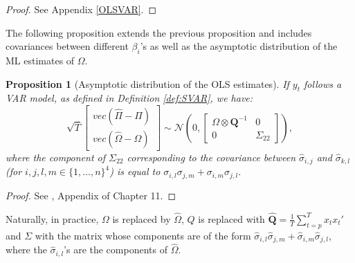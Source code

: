\documentclass[
]{book}
\newtheorem{proposition}{Proposition}[chapter]
\theoremstyle{definition}
\theoremstyle{definition}
\theoremstyle{definition}
\theoremstyle{definition}
\theoremstyle{remark}
\begin{document}
\begin{proof}
See Appendix \ref{OLSVAR}.
\end{proof}

The following proposition extends the previous proposition and includes covariances between different \(\beta_i\)'s as well as the asymptotic distribution of the ML estimates of \(\Omega\).

\begin{proposition}[Asymptotic distribution of the OLS estimates]
\protect\hypertarget{prp:OLSVAR2}{}\label{prp:OLSVAR2}If \(y_t\) follows a VAR model, as defined in Definition \ref{def:SVAR}, we have:
\begin{equation}
\sqrt{T}\left[
\begin{array}{c}
vec(\hat\Pi - \Pi)\\
vec(\hat\Omega - \Omega)
\end{array}
\right]
\sim \mathcal{N}\left(0,
\left[
\begin{array}{cc}
\Omega \otimes \mathbf{Q}^{-1} & 0\\
0 & \Sigma_{22}
\end{array}
\right]\right),\label{eq:asymptPi}
\end{equation}
where the component of \(\Sigma_{22}\) corresponding to the covariance between \(\hat\sigma_{i,j}\) and \(\hat\sigma_{k,l}\) (for \(i,j,l,m \in \{1,\dots,n\}^4\)) is equal to \(\sigma_{i,l}\sigma_{j,m}+\sigma_{i,m}\sigma_{j,l}\).
\end{proposition}

\begin{proof}
See \citet{Hamilton_1994}, Appendix of Chapter 11.
\end{proof}

Naturally, in practice, \(\Omega\) is replaced by \(\hat{\Omega}\), \(Q\) is replaced with \(\hat{\mathbf{Q}} = \frac{1}{T}\sum_{t=p}^T x_t x_t'\) and \(\Sigma\) with the matrix whose components are of the form \(\hat\sigma_{i,l}\hat\sigma_{j,m}+\hat\sigma_{i,m}\hat\sigma_{j,l}\), where the \(\hat\sigma_{i,l}\)'s are the components of \(\hat\Omega\).
\end{document}
